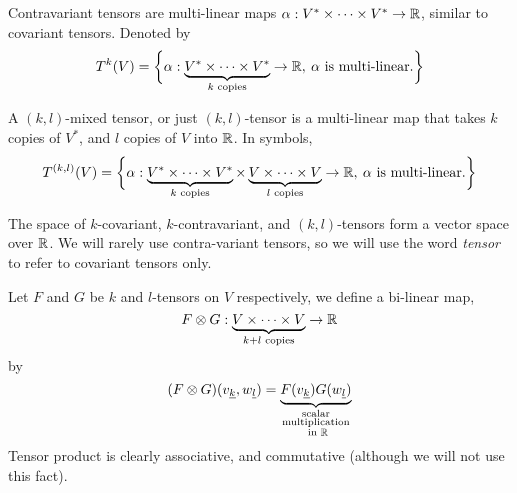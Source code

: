 \documentclass[../main-manifolds.tex]{subfiles}
\begin{document}
\begin{definition}
    Contravariant tensors are multi-linear maps $\alpha: V^*\times \cdots\times V^*\to \mathbb{R}$, similar to covariant tensors. Denoted by
    \[
        T^{k}(V) = \biggl\{{\alpha: \underbrace{V^*\times\cdots\times V^*}_{k\text{ copies}}\to\mathbb{R},\: \alpha\text{ is multi-linear.}}\biggr\}
    \]
\end{definition}

\begin{definition}
    A $(k,l)$-mixed tensor, or just $(k,l)$-tensor is a multi-linear map that takes $k$ copies of $V^*$, and $l$ copies of $V$ into $\mathbb{R}$. In symbols, 
    \[
        T^{(k,l)}(V) = \biggl\{{\alpha: \underbrace{V^*\times\cdots\times V^*}_{k\text{ copies}}\times \underbrace{V\times\cdots\times V}_{l\text{ copies}}\to\mathbb{R},\: \alpha\text{ is multi-linear.}}\biggr\}
    \]
\end{definition}

The space of $k$-covariant, $k$-contravariant, and $(k,l)$-tensors form a vector space over $\mathbb{R}$. We will rarely use contra-variant tensors, so we will use the word \emph{tensor} to refer to covariant tensors only.

\begin{definition}
    Let $F$ and $G$ be $k$ and $l$-tensors on $V$ respectively, we define a bi-linear map,
    \[
        F\otimes G: \underbrace{V\times \cdots \times V}_{k+l\text{ copies}}\to\mathbb{R}
    \]
    by
    \[
        (F\otimes G)(\Ul{v}[k],\Ul{w}[l]) = \underbrace{F(\Ul{v}[k])G(\Ul{w}[l])}_{\substack{\text{scalar}\\ \text{multiplication}\\ \text{ in }\real}}
    \]
    Tensor product is clearly associative, and commutative (although we will not use this fact).
\end{definition}
\end{document}
